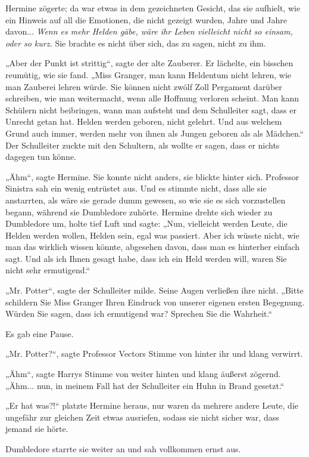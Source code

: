 {Hermine zögerte; da war etwas in dem gezeichneten Gesicht, das sie aufhielt, wie ein Hinweis auf all die Emotionen, die nicht gezeigt wurden, Jahre und Jahre davon... \emph{Wenn es mehr Helden gäbe, wäre ihr Leben vielleicht nicht so einsam, oder so kurz.} Sie brachte es nicht über sich, das zu sagen, nicht zu ihm.

„Aber der Punkt ist strittig“, sagte der alte Zauberer. Er lächelte, ein bisschen reumütig, wie sie fand. „Miss Granger, man kann Heldentum nicht lehren, wie man Zauberei lehren würde. Sie können nicht zwölf Zoll Pergament darüber schreiben, wie man weitermacht, wenn alle Hoffnung verloren scheint. Man kann Schülern nicht beibringen, wann man aufsteht und dem Schulleiter sagt, dass er Unrecht getan hat. Helden werden geboren, nicht gelehrt. Und aus welchem Grund auch immer, werden mehr von ihnen als Jungen geboren als als Mädchen.“ Der Schulleiter zuckte mit den Schultern, als wollte er sagen, dass er nichts dagegen tun könne.

„Ähm“, sagte Hermine. Sie konnte nicht anders, sie blickte hinter sich. Professor Sinistra sah ein wenig entrüstet aus. Und es stimmte nicht, dass alle sie anstarrten, als wäre sie gerade dumm gewesen, so wie sie es sich vorzustellen begann, während sie Dumbledore zuhörte. Hermine drehte sich wieder zu Dumbledore um, holte tief Luft und sagte: „Nun, vielleicht werden Leute, die Helden werden wollen, Helden sein, egal was passiert. Aber ich wüsste nicht, wie man das wirklich wissen könnte, abgesehen davon, dass man es hinterher einfach sagt. Und als ich Ihnen gesagt habe, dass ich ein Held werden will, waren Sie nicht sehr ermutigend.“

„Mr. Potter“, sagte der Schulleiter milde. Seine Augen verließen ihre nicht. „Bitte schildern Sie Miss Granger Ihren Eindruck von unserer eigenen ersten Begegnung. Würden Sie sagen, dass ich ermutigend war? Sprechen Sie die Wahrheit.“

Es gab eine Pause.

„Mr. Potter?“, sagte Professor Vectors Stimme von hinter ihr und klang verwirrt.

„Ähm“, sagte Harrys Stimme von weiter hinten und klang äußerst zögernd. „Ähm... nun, in meinem Fall hat der Schulleiter ein Huhn in Brand gesetzt.“

„Er hat was?!“ platzte Hermine heraus, nur waren da mehrere andere Leute, die ungefähr zur gleichen Zeit etwas ausriefen, sodass sie nicht sicher war, dass jemand sie hörte.

Dumbledore starrte sie weiter an und sah vollkommen ernst aus.

}
